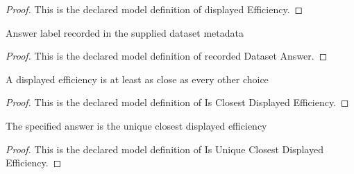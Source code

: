 \begin{proof}
  This is the declared model definition of displayed Efficiency.
\end{proof}
\begin{definition}
  \label{def:physics:phyx-mini-0482:phyxminiproblems-problemphyxmini0482-recordeddatasetanswer}
  Answer label recorded in the supplied dataset metadata
\end{definition}
\begin{proof}
  This is the declared model definition of recorded Dataset Answer.
\end{proof}
\begin{definition}
  \label{def:physics:phyx-mini-0482:phyxminiproblems-problemphyxmini0482-isclosestdisplayedefficiency}
  A displayed efficiency is at least as close as every other choice
\end{definition}
\begin{proof}
  This is the declared model definition of Is Closest Displayed Efficiency.
\end{proof}
\begin{definition}
  \label{def:physics:phyx-mini-0482:phyxminiproblems-problemphyxmini0482-isuniqueclosestdisplayedefficiency}
  The specified answer is the unique closest displayed efficiency
\end{definition}
\begin{proof}
  This is the declared model definition of Is Unique Closest Displayed Efficiency.
\end{proof}
